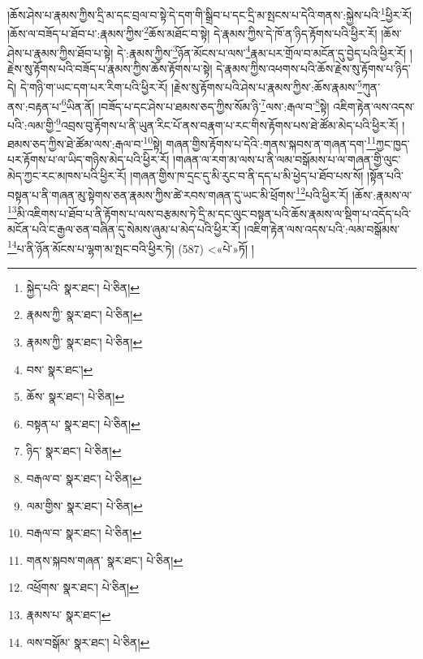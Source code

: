 །ཆོས་ཤེས་པ་རྣམས་ཀྱིས་དྲི་མ་དང་བྲལ་བ་སྟེ་དེ་དག་གི་སྒྲིབ་པ་དང་དྲི་མ་སྤངས་པ་དེའི་གནས་:སྐྱེས་པའི་\footnote{སྐྱེད་པའི་  སྣར་ཐང་།  པེ་ཅིན། }ཕྱིར་རོ། །ཆོས་ལ་བཟོད་པ་ཐོབ་པ་:རྣམས་ཀྱིས་\footnote{རྣམས་ཀྱི་  སྣར་ཐང་།  པེ་ཅིན། }ཆོས་མཐོང་བ་སྟེ། དེ་རྣམས་ཀྱིས་དེ་ཁོ་ན་ཉིད་རྟོགས་པའི་ཕྱིར་རོ། །ཆོས་ཤེས་པ་རྣམས་ཀྱིས་ཐོབ་པ་སྟེ། དེ་:རྣམས་ཀྱིས་\footnote{རྣམས་ཀྱི་  སྣར་ཐང་།  པེ་ཅིན། }ཉོན་མོངས་པ་ལས་\footnote{བས་  སྣར་ཐང་། }རྣམ་པར་གྲོལ་བ་མངོན་དུ་བྱེད་པའི་ཕྱིར་རོ། །རྗེས་སུ་རྟོགས་པའི་བཟོད་པ་རྣམས་ཀྱིས་ཆོས་རྟོགས་པ་སྟེ། དེ་རྣམས་ཀྱིས་འཕགས་པའི་ཆོས་རྗེས་སུ་རྟོགས་པ་ཉིད་དེ། དེ་གཉི་ག་ཡང་དག་པར་རིག་པའི་ཕྱིར་རོ། །རྗེས་སུ་རྟོགས་པའི་ཤེས་པ་རྣམས་ཀྱིས་:ཆོས་རྣམས་\footnote{ཆོས་  སྣར་ཐང་།  པེ་ཅིན། }ཀུན་ནས་:བརྟན་པ་\footnote{བསྟན་པ་  སྣར་ཐང་།  པེ་ཅིན། }ཡིན་ནོ། །བཟོད་པ་དང་ཤེས་པ་ཐམས་ཅད་ཀྱིས་སོམ་ཉི་\footnote{ཉིད་  སྣར་ཐང་།  པེ་ཅིན། }ལས་:རྒལ་བ་\footnote{བརྒལ་བ་  སྣར་ཐང་།  པེ་ཅིན། }སྟེ། འཇིག་རྟེན་ལས་འདས་པའི་:ལམ་གྱི་\footnote{ལམ་གྱིས་  སྣར་ཐང་།  པེ་ཅིན། }འབྲས་བུ་རྟོགས་པ་ནི་ཡུན་རིང་པོ་ནས་བརྣག་པ་རང་གིས་རྟོགས་པས་ཐེ་ཚོམ་མེད་པའི་ཕྱིར་རོ། །ཐམས་ཅད་ཀྱིས་ཐེ་ཚོམ་ལས་:རྒལ་བ་\footnote{བརྒལ་བ་  སྣར་ཐང་།  པེ་ཅིན། }སྟེ། གཞན་གྱིས་རྟོགས་པ་དེའི་:གནས་སྐབས་ན་གཞན་དག་\footnote{གནས་སྐབས་གཞན་  སྣར་ཐང་།  པེ་ཅིན། }ཀྱང་ཁྱད་པར་རྟོགས་པ་ལ་ཡིད་གཉིས་མེད་པའི་ཕྱིར་རོ། །གཞན་ལ་རག་མ་ལས་པ་ནི་ལམ་བསྒོམས་པ་ལ་གཞན་གྱི་ལུང་མེད་ཀྱང་རང་མཁས་པའི་ཕྱིར་རོ། །གཞན་གྱིས་ཁ་དྲང་དུ་མི་རུང་བ་ནི་དད་པ་མི་ཕྱེད་པ་ཐོབ་པས་སོ། །སྟོན་པའི་བསྟན་པ་ནི་གཞན་མུ་སྟེགས་ཅན་རྣམས་ཀྱིས་ཚེ་རབས་གཞན་དུ་ཡང་མི་ཕྲོགས་\footnote{འཕྲོགས་  སྣར་ཐང་།  པེ་ཅིན། }པའི་ཕྱིར་རོ། །ཆོས་:རྣམས་ལ་\footnote{རྣམས་པ་  སྣར་ཐང་། }མི་འཇིགས་པ་ཐོབ་པ་ནི་རྟོགས་པ་ལས་བརྩམས་ཏེ་དྲི་མ་དང་ལུང་བསྟན་པའི་ཆོས་རྣམས་ལ་སྡིག་པ་འདོད་པའི་མངོན་པའི་ང་རྒྱལ་ཅན་བཞིན་དུ་སེམས་ཞུམ་པ་མེད་པའི་ཕྱིར་རོ། །འཇིག་རྟེན་ལས་འདས་པའི་:ལམ་བསྒོམས་\footnote{ལས་བསྒོམ་  སྣར་ཐང་།  པེ་ཅིན། }པ་ནི་ཉོན་མོངས་པ་ལྷག་མ་སྤང་བའི་ཕྱིར་ཏེ། (587) <«པེ་»ཏོ། །
